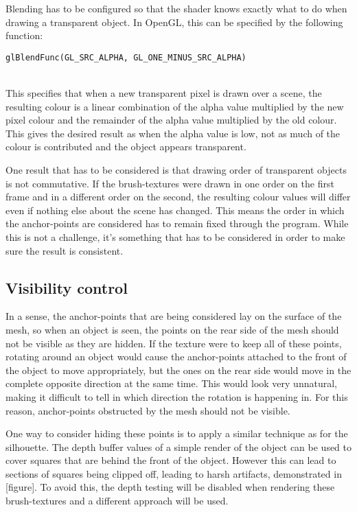 \documentclass[a4paper, 12pt]{article}
\begin{document}
Blending has to be configured so that the shader knows exactly what to do when drawing a transparent object. In OpenGL, this can be specified by the following function:\\
\centerline{\texttt{glBlendFunc(GL\_SRC\_ALPHA, GL\_ONE\_MINUS\_SRC\_ALPHA)\;}}\\
This specifies that when a new transparent pixel is drawn over a scene, the resulting colour is a linear combination of the alpha value multiplied by the new pixel colour and the remainder of the alpha value multiplied by the old colour. This gives the desired result as when the alpha value is low, not as much of the colour is contributed and the object appears transparent.

One result that has to be considered is that drawing order of transparent objects is not commutative. If the brush-textures were drawn in one order on the first frame and in a different order on the second, the resulting colour values will differ even if nothing else about the scene has changed. This means the order in which the anchor-points are considered has to remain fixed through the program. While this is not a challenge, it's something that has to be considered in order to make sure the result is consistent.


\subsection{Visibility control}
In a sense, the anchor-points that are being considered lay on the surface of the mesh, so when an object is seen, the points on the rear side of the mesh should not be visible as they are hidden. If the texture were to keep all of these points, rotating around an object would cause the anchor-points attached to the front of the object to move appropriately, but the ones on the rear side would move in the complete opposite direction at the same time. This would look very unnatural, making it difficult to tell in which direction the rotation is happening in. For this reason, anchor-points obstructed by the mesh should not be visible.

One way to consider hiding these points is to apply a similar technique as for the silhouette. The depth buffer values of a simple render of the object can be used to cover squares that are behind the front of the object. However this can lead to sections of squares being clipped off, leading to harsh artifacts, demonstrated in [figure]. To avoid this, the depth testing will be disabled when rendering these brush-textures and a different approach will be used.
\end{document}
